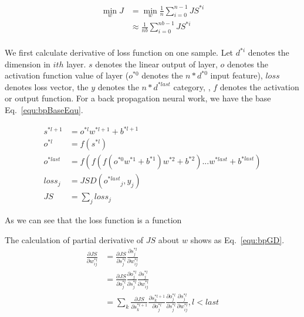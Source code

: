 \documentclass[runningheads,openany]{xhlPaper}
\begin{document}
\begin{equation}
\label{equ:bpOOF}
\begin{aligned}
\mathop {\min }\limits_w J &= \mathop {\min }\limits_w \frac{1}{n}\sum\limits_{i = 0}^{n - 1} {J{S^{*i}}}\\
&\approx \frac{1}{{nb}}\sum\limits_{i = 0}^{nb - 1} {J{S^{*i}}}\\
\end{aligned}
\end{equation}

We first calculate derivative of loss function on one sample. 
Let $d^{*i}$ denotes the dimension in $ith$ layer. $s$ denotes the linear output of layer, $o$ denotes the activation function value of layer ($o^{*0}$ denotes the $n * d^{*0}$ input feature), $loss$ denotes loss vector, the $y$ denotes the $n * d^{*last}$ category, , $f$ denotes the activation or output function.
For a back propagation neural work, we have the base Eq.~\ref{equ:bpBaseEqu}.

\begin{equation}
\label{equ:bpBaseEqu}
\begin{aligned}
{s^{*l + 1}} &= {o^{*l}}{w^{*l + 1}} + {b^{*l + 1}}\\
{o^{*l}} &= f\left( {{s^{*l}}} \right)\\
{o^{*last}} &= f\left( {f\left( {f\left( {{o^{*0}}{w^{*1}} + {b^{*1}}} \right){w^{*2}} + {b^{*2}}} \right)...{w^{*last}} + {b^{*last}}} \right)\\
los{s_j} &= JSD\left( {{o^{*last}}_j,{y_j}} \right)\\
JS &= \sum\limits_j {los{s_j}} 
\end{aligned}
\end{equation}

As we can see that the loss function is a function 

The calculation of partial derivative of $JS$ about $w$ shows as Eq.~\ref{equ:bpGD}.
\begin{equation}
\label{equ:bpGD}
\begin{aligned}
\frac{\partial{JS}}{\partial{w^{*l}_{ij}}} &= \frac{\partial{JS}}{\partial{s^{*l}_{j}}}\frac{\partial{s^{*l}_{j}}}{\partial{w^{*l}_{ij}}}\\
&= \frac{\partial{JS}}{\partial{o^{*l}_{j}}}\frac{\partial{o^{*l}_{j}}}{\partial{s^{*l}_{j}}}\frac{\partial{s^{*l}_{j}}}{\partial{w^{*l}_{ij}}}\\
&= \sum_{k}{\frac{\partial{JS}}{\partial{s^{*l + 1}_{k}}}\frac{{\partial{s^{*l + 1}_{k}}}}{\partial{o^{*l}_{j}}}}\frac{\partial{o^{*l}_{j}}}{\partial{s^{*l}_{j}}}\frac{\partial{s^{*l}_{j}}}{\partial{w^{*l}_{ij}}},l < last\\
\end{aligned}
\end{equation}
\end{document}
